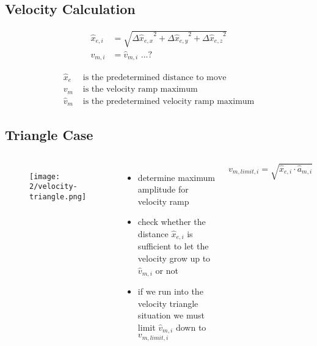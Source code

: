 \documentclass[%
  professionalfonts,%
  xcolor={%
    usenames,%
    dvipsnames,%
    svgnames,%
    table,%
    hyperref%
  }%
]{beamer}
\begin{document}
\subsection{Velocity Calculation}
\begin{frame}
	\begin{align*}
	\hat{x}_{e,i} & = \sqrt{{\Delta\hat{x}_{e,x}}^{2} + {\Delta\hat{x}_{e,y}}^{2} + {\Delta\hat{x}_{e,z}}^{2} } \\
	v_{m,i } & = \hat{v}_{m,i} \text{ ...?}
	\end{align*}
	
	\begin{align*}
	\hat{x}_{e} & \text{ is the predetermined distance to move} \\
	v_{m} & \text{ is the velocity ramp maximum} \\
	\hat{v}_{m} & \text{ is the predetermined velocity ramp maximum}
	\end{align*}
\end{frame}

\subsection{Triangle Case}
\begin{frame}
  \begin{columns}
    \begin{figure}[h]
      \texttt{[image: 2/velocity-triangle.png]}
      \label{fig:velocity-triangle}
    \end{figure}
    \begin{itemize}
      \item determine maximum amplitude for velocity ramp
      \item check whether the distance $\hat{x}_{e,i}$ is sufficient to let the velocity grow up to $\hat{v}_{m,i}$ or not
      \item if we run into the velocity triangle situation we must limit $\hat{v}_{m,i}$ down to $v_{m,limit,i}$
    \end{itemize}
    
    \begin{equation*}
    v_{m,limit,i} = \sqrt{\hat{x}_{e,i} \cdot \hat{a}_{m,i}}
    \end{equation*}
  \end{columns}
\end{frame}
\end{document}
